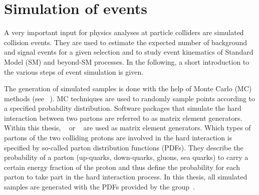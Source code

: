 


\FloatBarrier
\chapter{Simulation of events}
\label{ch:SimulationOfEvents}
A very important input for physics analyses at particle colliders are simulated collision events.
They are used to estimate the expected number of background and signal events for a given selection and to study event kinematics of Standard Model (SM) and beyond-SM processes.
In the following, a short introduction to the various steps of event simulation is given.

The generation of simulated samples is done with the help of Monte Carlo (MC) methods (see \eg~\cite{bib:MC_Introduction}).
MC techniques are used to randomly sample points according to a specified probability distribution.
Software packages that simulate the hard interaction between two partons are referred to as matrix element generators.
Within this thesis, \madgraph~\cite{bib:Madgraph_2014} or \pythiaSix~\cite{bib:Pyhtia6_2006} are used as matrix element generators.
Which types of partons of the two colliding protons are involved in the hard interaction is specified by so-called parton distribution functions (PDFs).
They describe the probability of a parton (up-quarks, down-quarks, gluons, sea quarks) to carry a certain energy fraction of the proton and thus define the probability for each parton to take part in the hard interaction process.
In this thesis, all simulated samples are generated with the PDFs provided by the \cteq group~\cite{Pumplin:2002vw}.


